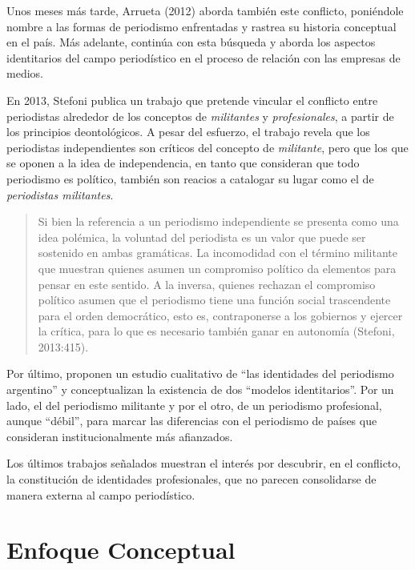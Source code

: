 Unos meses más tarde, Arrueta (2012) aborda también este conflicto, poniéndole nombre a las formas de periodismo enfrentadas  y rastrea su historia conceptual en el país. Más adelante, continúa con esta búsqueda y aborda los aspectos identitarios del campo periodístico en el proceso de relación con las empresas de medios.

En 2013, Stefoni publica un trabajo que pretende vincular el conflicto entre periodistas alrededor de los conceptos de \emph{militantes} y \emph{profesionales}, a partir de los principios deontológicos. A pesar del esfuerzo, el trabajo revela que los periodistas independientes son críticos del concepto de \emph{militante}, pero que los que se oponen a la idea de independencia, en tanto que consideran que todo periodismo es político, también son reacios a catalogar su lugar como el de \emph{periodistas militantes}.

\begin{quote}
	Si bien la referencia a un periodismo independiente se presenta como una idea polémica, la voluntad del periodista es un valor que puede ser sostenido en ambas gramáticas. La incomodidad con el término militante que muestran quienes asumen un compromiso político da elementos para pensar en este sentido. A la inversa, quienes rechazan el compromiso político asumen que el periodismo tiene una función social trascendente para el orden democrático, esto es, contraponerse a los gobiernos y ejercer la crítica, para lo que es necesario también ganar en autonomía (Stefoni, 2013:415).
\end{quote}


Por último, \textcite{@6979-URE2014} proponen un estudio cualitativo de \enquote{las identidades del periodismo argentino} y conceptualizan la existencia de dos \enquote{modelos identitarios}. Por un lado, el del periodismo militante y por el otro, de un periodismo profesional, aunque \enquote{débil}, para marcar las diferencias con el periodismo de países que consideran institucionalmente más afianzados.

Los últimos trabajos señalados muestran el interés por descubrir, en el conflicto, la constitución de identidades profesionales, que no parecen consolidarse de manera externa al campo periodístico.

\section {Enfoque Conceptual}

